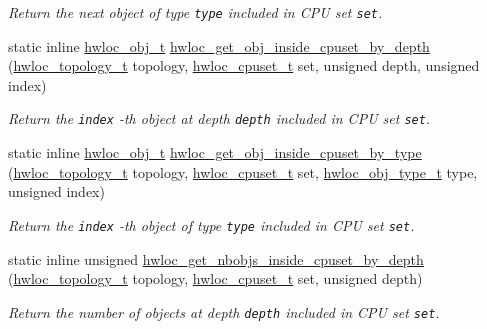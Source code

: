 \begin{CompactItemize}
\begin{CompactList}\small\item\em Return the next object of type {\tt type} included in CPU set {\tt set}. \item\end{CompactList}\item 
static inline \hyperlink{structhwloc__obj}{hwloc\_\-obj\_\-t} \hyperlink{group__hwlocality__helper__find__inside_ge16043beea2e342c66b762854d95381f}{hwloc\_\-get\_\-obj\_\-inside\_\-cpuset\_\-by\_\-depth} (\hyperlink{group__hwlocality__topology_g9d1e76ee15a7dee158b786c30b6a6e38}{hwloc\_\-topology\_\-t} topology, \hyperlink{group__hwlocality__cpuset_g82e51d695c430832b703dad5ab8d75e4}{hwloc\_\-cpuset\_\-t} set, unsigned depth, unsigned index)
\begin{CompactList}\small\item\em Return the {\tt index} -th object at depth {\tt depth} included in CPU set {\tt set}. \item\end{CompactList}\item 
static inline \hyperlink{structhwloc__obj}{hwloc\_\-obj\_\-t} \hyperlink{group__hwlocality__helper__find__inside_gcd512d31b960cfaf1defee895cb6dfff}{hwloc\_\-get\_\-obj\_\-inside\_\-cpuset\_\-by\_\-type} (\hyperlink{group__hwlocality__topology_g9d1e76ee15a7dee158b786c30b6a6e38}{hwloc\_\-topology\_\-t} topology, \hyperlink{group__hwlocality__cpuset_g82e51d695c430832b703dad5ab8d75e4}{hwloc\_\-cpuset\_\-t} set, \hyperlink{group__hwlocality__types_gcd37bb612667dc437d66bfb175a8dc55}{hwloc\_\-obj\_\-type\_\-t} type, unsigned index)
\begin{CompactList}\small\item\em Return the {\tt index} -th object of type {\tt type} included in CPU set {\tt set}. \item\end{CompactList}\item 
static inline unsigned \hyperlink{group__hwlocality__helper__find__inside_gce5af1ea003c8269566b6726fade7b32}{hwloc\_\-get\_\-nbobjs\_\-inside\_\-cpuset\_\-by\_\-depth} (\hyperlink{group__hwlocality__topology_g9d1e76ee15a7dee158b786c30b6a6e38}{hwloc\_\-topology\_\-t} topology, \hyperlink{group__hwlocality__cpuset_g82e51d695c430832b703dad5ab8d75e4}{hwloc\_\-cpuset\_\-t} set, unsigned depth)
\begin{CompactList}\small\item\em Return the number of objects at depth {\tt depth} included in CPU set {\tt set}. \item\end{CompactList}\item 

\end{CompactItemize}

